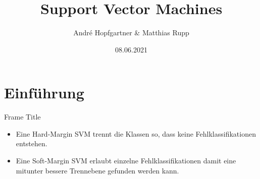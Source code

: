\documentclass[ngerman]{beamer}
\title{Support Vector Machines}
\author{André Hopfgartner \& Matthias Rupp}
\institute{Vorarlberg University of Applied Sciences}
\date{08.06.2021}
\begin{document}
\begin{frame}[plain]
    \maketitle
\end{frame}

\section{Einführung}


\begin{frame}{Frame Title}
\begin{itemize}
	\item Eine Hard-Margin SVM trennt die Klassen so, dass keine Fehlklassifikationen entstehen. 
	\pause 
	\item Eine Soft-Margin SVM erlaubt einzelne Fehlklassifikationen damit eine mitunter bessere Trennebene gefunden werden kann.
\end{itemize}
	
\end{frame}
\end{document}
